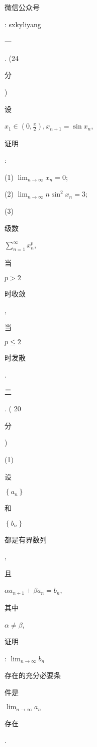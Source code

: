\documentclass[10pt]{article}
\begin{document}
\begin{CJK}{UTF8}{mj}微信公众号\end{CJK}: sxkyliyang

\begin{CJK}{UTF8}{mj}一\end{CJK}. (24 \begin{CJK}{UTF8}{mj}分\end{CJK}) \begin{CJK}{UTF8}{mj}设\end{CJK} $x_{1} \in\left(0, \frac{\pi}{2}\right), x_{n+1}=\sin x_{n}$, \begin{CJK}{UTF8}{mj}证明\end{CJK}:

(1) $\lim _{n \rightarrow \infty} x_{n}=0$;

(2) $\lim _{n \rightarrow \infty} n \sin ^{2} x_{n}=3$;

(3) \begin{CJK}{UTF8}{mj}级数\end{CJK} $\sum_{n=1}^{\infty} x_{n}^{p}$, \begin{CJK}{UTF8}{mj}当\end{CJK} $p>2$ \begin{CJK}{UTF8}{mj}时收敛\end{CJK}, \begin{CJK}{UTF8}{mj}当\end{CJK} $p \leqslant 2$ \begin{CJK}{UTF8}{mj}时发散\end{CJK}.

\begin{CJK}{UTF8}{mj}二\end{CJK}. ( 20 \begin{CJK}{UTF8}{mj}分\end{CJK})

(1) \begin{CJK}{UTF8}{mj}设\end{CJK} $\left\{a_{n}\right\}$ \begin{CJK}{UTF8}{mj}和\end{CJK} $\left\{b_{n}\right\}$ \begin{CJK}{UTF8}{mj}都是有界数列\end{CJK}, \begin{CJK}{UTF8}{mj}且\end{CJK} $\alpha a_{n+1}+\beta a_{n}=b_{n}$, \begin{CJK}{UTF8}{mj}其中\end{CJK} $\alpha \neq \beta$, \begin{CJK}{UTF8}{mj}证明\end{CJK}: $\lim _{n \rightarrow \infty} b_{n}$ \begin{CJK}{UTF8}{mj}存在的充分必要条\end{CJK} \begin{CJK}{UTF8}{mj}件是\end{CJK} $\lim _{n \rightarrow \infty} a_{n}$ \begin{CJK}{UTF8}{mj}存在\end{CJK}.
\end{document}
